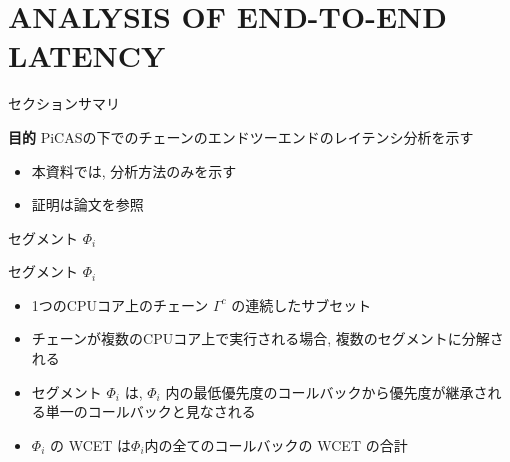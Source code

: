 
\section{ANALYSIS OF END-TO-END LATENCY}
\label{sec: analysis of end-to-end latency}

\begin{frame}{セクションサマリ}
    \begin{itembox}[l]{\textbf{目的}}
        PiCASの下でのチェーンのエンドツーエンドのレイテンシ分析を示す
    \end{itembox}
\end{frame}

\begin{frame}{}
    \begin{itemize}
        \item 本資料では, 分析方法のみを示す
        \item 証明は論文を参照
    \end{itemize}
\end{frame}

\begin{frame}{セグメント $\Phi_i$}
    \begin{block}{セグメント $\Phi_i$}
        \begin{itemize}
            \item 1つのCPUコア上のチェーン $\Gamma^{c}$ の連続したサブセット
            \item チェーンが複数のCPUコア上で実行される場合, 複数のセグメントに分解される
            \item セグメント $\Phi_{i}$ は, $\Phi_{i}$ 内の最低優先度のコールバックから優先度が継承される単一のコールバックと見なされる
            \item $\Phi_{i}$ の WCET は$\Phi_{i}$内の全てのコールバックの WCET の合計
        \end{itemize}
    \end{block}
\end{frame}


